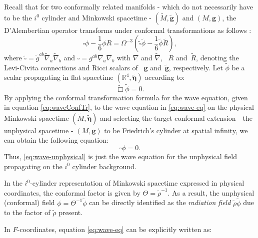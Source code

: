 Recall that for two conformally related manifolds - which do not necessarily have to be the $i^0$ cylinder and Minkowski spacetime - $(\tilde{M},\tilde{\boldsymbol{g}})$ and $(M,\boldsymbol{g})$, the D'Alembertian operator
transforms under conformal transformations as follows \cite{DuaFenGasHil22}:
\begin{equation}\label{eq:waveConfTr}
	\square \phi-\frac{1}{6} \phi R=\Omega^{-3}\left(\tilde{\square} \tilde{\phi}-\frac{1}{6} \tilde{\phi} \tilde{R}\right),
\end{equation}
where $\tilde{\square}=\tilde{g}^{ab}\tilde{\nabla}_a\tilde{\nabla}_b$ and $\square=g^{ab}\nabla_a\nabla_b$ with $\nabla$ and $\tilde{\nabla}$, ~$R$ and~$\tilde{R}$,
denoting the Levi-Civita connections and Ricci scalars of ~$\boldsymbol{g}$ and~$\tilde{\boldsymbol{g}}$, respectively.  Let $\tilde{\phi}$ be a scalar propagating in
flat spacetime $(\mathbb{R}^4, \tilde{\boldsymbol{\eta}})$ according to:
\begin{equation}\label{eq:wave-eq}
	\tilde{\Box} \tilde{\phi} = 0.
\end{equation}
By applying the conformal transformation formula for the wave equation, given in equation \eqref{eq:waveConfTr}, to the wave equation in \eqref{eq:wave-eq} on the physical Minkowski spacetime $(\tilde{M} , \tilde{\boldsymbol{\eta}})$ and selecting the target conformal extension - the unphysical spacetime - $(M, \boldsymbol{g})$ to be Friedrich's cylinder at spatial infinity, we can obtain the following equation:
\begin{equation}\label{eq:wave-unphysical}
	\square \phi = 0.
\end{equation}
Thus, \eqref{eq:wave-unphysical} is just the wave equation for the unphysical field propagating on the $i^0$ cylinder background.

\begin{remark}
  In the $i^0$-cylinder representation of Minkowski spacetime expressed in physical coordinates, the conformal factor is given by $\Theta=\tilde{\rho}^{-1}$. As a result, the unphysical (conformal) field $\phi=\Theta^{-1}\tilde{\phi}$ can be directly identified as the \emph{radiation field} $\tilde{\rho}\tilde{\phi}$ due to the factor of $\tilde{\rho}$ present.
\end{remark}

\noindent In $F$-coordinates, equation \eqref{eq:wave-eq} can be explicitly written as:

